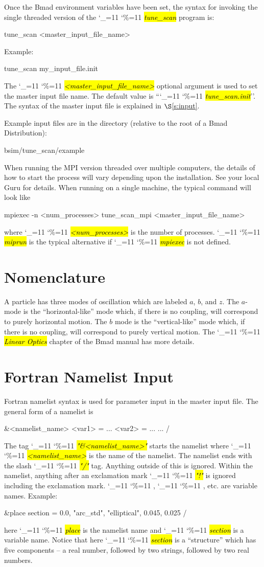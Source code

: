 \documentclass{hitec}
\newcommand\dottcmd[1]{\hl{\em#1}\endgroup}
\newcommand{\vn}{\begingroup\catcode`\_=11 \catcode`\%=11 \dottcmd}
\newcommand{\ts}{\vn{tune_scan}\xspace}
\newcommand{\sref}[1]{$\S$\ref{#1}}
\newcommand{\Section}[1]{\section{#1}\vspace*{-1ex}}
\begin{document}
Once the Bmad environment variables have been set, the syntax for invoking the single threaded
version of the \ts program is:
\begin{code}
tune_scan {<master_input_file_name>}
\end{code}
Example:
\begin{code}
tune_scan my_input_file.init
\end{code}
The \vn{<master_input_file_name>} optional argument is used to set the master input file name. The
default value is ``\vn{tune_scan.init}''. The syntax of the master input file is explained
in \sref{s:input}.

Example input files are in the directory (relative to the root of a Bmad Distribution):
\begin{code}
bsim/tune_scan/example
\end{code}

When running the MPI version threaded over multiple computers, the details of how to start the
process will vary depending upon the installation. See your local Guru for details. When running on
a single machine, the typical command will look like
\begin{code}
mpiexec -n <num_processes> tune_scan_mpi {<master_input_file_name>}
\end{code}
where \vn{<num_processes>} is the number of processes. \vn{miprun} is the typical alternative if
\vn{mpiexec} is not defined.

\Section{Nomenclature}
\label{s:nomen}

A particle has three modes of oscillation which are labeled $a$, $b$, and $z$. The $a$-mode is the
``horizontal-like'' mode which, if there is no coupling, will correspond to purely horizontal
motion.  The $b$ mode is the ``vertical-like'' mode which, if there is no coupling, will correspond
to purely vertical motion. The \vn{Linear Optics} chapter of the Bmad manual has more details.

\Section{Fortran Namelist Input}
\label{s:namelist}

Fortran namelist syntax is used for parameter input in the master input file. The general form of a namelist is
\begin{code}
&<namelist_name>
  <var1> = ...
  <var2> = ...
  ...
/
\end{code}
The tag \vn{"\&<namelist_name>"} starts the namelist where \vn{<namelist_name>} is the name of the
namelist. The namelist ends with the slash \vn{"/"} tag. Anything outside of this is ignored. Within
the namelist, anything after an exclamation mark \vn{"!"} is ignored including the exclamation
mark. \vn{<var1>}, \vn{<var2>}, etc. are variable names. Example:
\begin{code}
&place 
  section = 0.0, "arc_std", "elliptical", 0.045, 0.025 
/
\end{code}
here \vn{place} is the namelist name and \vn{section} is a variable name.  Notice that here
\vn{section} is a ``structure'' which has five components -- a real number, followed by two strings,
followed by two real numbers.
\end{document}
